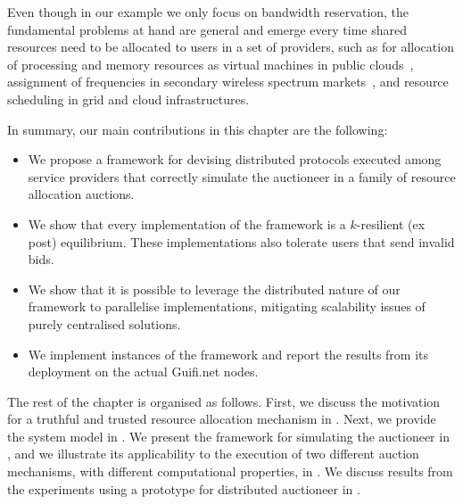 Even though in our example we only focus on bandwidth
reservation, the fundamental problems at hand are general and emerge
every time shared resources need to be allocated to users in a set of
providers, such as for allocation of processing and memory resources
as virtual machines in public clouds~\cite{Zhang2015Truthful},
assignment of frequencies in secondary wireless spectrum
markets~\cite{Zhou2008}, and resource scheduling in grid and cloud
infrastructures\cite{Lai2004}.

In summary, our main contributions in this chapter are the following:

\begin{itemize}

\item We propose a framework for devising distributed protocols executed among service providers that correctly simulate the
auctioneer in a family of resource allocation auctions.

\item We show that every implementation of the framework is a $k$-resilient (ex post) equilibrium.
These implementations also tolerate users that send invalid bids.

\item We show that it is possible to leverage the distributed nature of our framework to parallelise implementations,
mitigating scalability issues of purely centralised solutions.

\item We implement instances of the framework and report the results from its deployment on the actual Guifi.net nodes.

\end{itemize}


\vspace{0.3mm}
The rest of the chapter is organised as follows.
First, we discuss the motivation for a truthful and trusted resource allocation mechanism in .
Next, we provide the system model in .
We present the framework for simulating the auctioneer in , 
and we illustrate its applicability to the execution
of two different auction mechanisms,
with different computational properties, in .
We discuss results from the experiments using a prototype for distributed auctioneer in .

